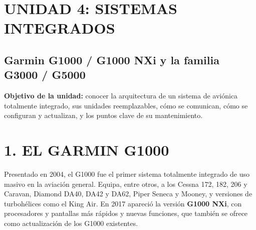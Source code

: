 \clearpage
\section*{UNIDAD 4: SISTEMAS INTEGRADOS}
\subsection*{Garmin G1000 / G1000 NXi y la familia G3000 / G5000}

\begin{recuadro}
\textbf{Objetivo de la unidad:} conocer la arquitectura de un sistema de aviónica totalmente
integrado, sus unidades reemplazables, cómo se comunican, cómo se configuran y actualizan, y los
puntos clave de su mantenimiento.
\end{recuadro}

\section*{1. EL GARMIN G1000}

Presentado en 2004, el G1000 fue el primer sistema totalmente integrado de uso masivo en la
aviación general. Equipa, entre otros, a los Cessna 172, 182, 206 y Caravan, Diamond DA40, DA42 y
DA62, Piper Seneca y Mooney, y versiones de turbohélices como el King Air. En 2017 apareció la
versión \textbf{G1000 NXi}, con procesadores y pantallas más rápidos y nuevas funciones, que también
se ofrece como actualización de los G1000 existentes.

